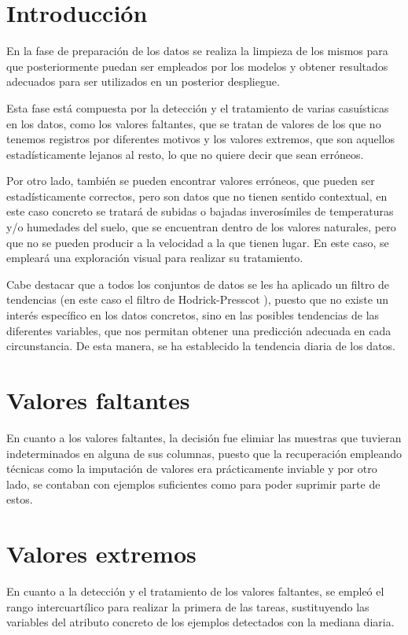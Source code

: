 
\section{Introducción}
En la fase de preparación de los datos se realiza la limpieza de los mismos para 
que posteriormente puedan ser empleados por los modelos y obtener resultados adecuados
para ser utilizados en un posterior despliegue.

Esta fase está compuesta por la detección y el tratamiento de varias casuísticas en 
los datos, como los valores faltantes, que se tratan de valores de los que no tenemos
registros por diferentes motivos y los valores extremos, que son aquellos
estadísticamente lejanos al resto, lo que no quiere decir que sean erróneos.

Por otro lado, también se pueden encontrar valores erróneos, que pueden ser 
estadísticamente correctos, pero son datos que no tienen sentido contextual, en este
caso concreto se tratará de subidas o bajadas inverosímiles de temperaturas 
y/o humedades del suelo, que se encuentran dentro de los valores naturales,
pero que no se pueden producir a la velocidad a la que tienen lugar.
En este caso, se empleará una exploración visual para realizar su tratamiento. 

Cabe destacar que a todos los conjuntos de datos se les ha aplicado un filtro de 
tendencias (en este caso el filtro de Hodrick-Presscot \cite{misc:wikipediaHodrick2023}), 
puesto que no existe un interés específico en los datos concretos, sino en las posibles 
tendencias de las diferentes variables, que nos permitan obtener una predicción adecuada 
en cada circunstancia.
De esta manera, se ha establecido la tendencia diaria de los datos.

\section{Valores faltantes}
En cuanto a los valores faltantes, la decisión fue elimiar las muestras que tuvieran
indeterminados en alguna de sus columnas, puesto que la recuperación empleando técnicas
como la imputación de valores era prácticamente inviable y por otro lado, se contaban
con ejemplos suficientes como para poder suprimir parte de estos.

\section{Valores extremos}
En cuanto a la detección y el tratamiento de los valores faltantes, se empleó el 
rango intercuartílico para realizar la primera de las tareas, sustituyendo las variables
del atributo concreto de los ejemplos detectados con la mediana diaria.

